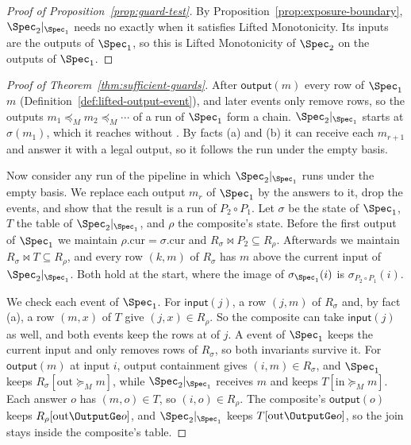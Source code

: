 \begin{proof}[Proof of Proposition~\ref{prop:guard-test}]
By Proposition~\ref{prop:exposure-boundary}, $\Spec_2|_{\Spec_1}$ needs
no \commitment exactly when it satisfies Lifted Monotonicity.  Its inputs are
the outputs of $\Spec_1$, so this is Lifted Monotonicity of $\Spec_2$ on the
outputs of $\Spec_1$.
\end{proof}

\begin{proof}[Proof of Theorem~\ref{thm:sufficient-guards}]
After $\mathsf{output}(m)$ every row of $\Spec_1$ \outrel $m$
(Definition~\ref{def:lifted-output-event}), and later events only remove
rows, so the outputs $m_1\preceq_M m_2\preceq_M\cdots$ of a run of $\Spec_1$
form a chain.  $\Spec_2|_{\Spec_1}$ starts at $\sigma(m_1)$, which it reaches
without \commitment.  By facts (a) and (b) it can receive each $m_{r+1}$ and
answer it with a legal output, so it follows the run under the empty basis.

Now consider any run of the pipeline in which $\Spec_2|_{\Spec_1}$ runs under
the empty basis.  We replace each output $m_r$ of $\Spec_1$ by the answers to
it, drop the \commitment events, and show that the result is a run of
$P_2\circ P_1$.  Let $\sigma$ be the state of $\Spec_1$, $T$ the table of
$\Spec_2|_{\Spec_1}$, and $\rho$ the composite's state.  Before the first
output of $\Spec_1$ we maintain $\rho.\mathrm{cur}=\sigma.\mathrm{cur}$ and
$R_\sigma\Join P_2\subseteq R_\rho$.  Afterwards we maintain $R_\sigma\Join
T\subseteq R_\rho$, and every row $(k,m)$ of $R_\sigma$ has $m$ above the
current input of $\Spec_2|_{\Spec_1}$.  Both hold at the start, where the
image of $\sigma_{\Spec_1}(i)$ is $\sigma_{P_2\circ P_1}(i)$.

We check each event of $\Spec_1$.  For $\mathsf{input}(j)$, a row $(j,m)$ of
$R_\sigma$ and, by fact (a), a row $(m,x)$ of $T$ give $(j,x)\in R_\rho$.  So
the composite can take $\mathsf{input}(j)$ as well, and both events keep the
rows at \indescs of $j$.  A \commitment event of $\Spec_1$ keeps the current
input and only removes rows of $R_\sigma$, so both invariants survive it.  For
$\mathsf{output}(m)$ at input $i$, output containment gives $(i,m)\in
R_\sigma$, and $\Spec_1$ keeps $R_\sigma[\mathrm{out}\succeq_M m]$, while
$\Spec_2|_{\Spec_1}$ receives $m$ and keeps $T[\mathrm{in}\succeq_M m]$.  Each
answer $o$ has $(m,o)\in T$, so $(i,o)\in R_\rho$.  The composite's
$\mathsf{output}(o)$ keeps $R_\rho[\mathrm{out}\OutputGe o]$, and
$\Spec_2|_{\Spec_1}$ keeps $T[\mathrm{out}\OutputGe o]$, so the join stays
inside the composite's table.


\end{proof}
